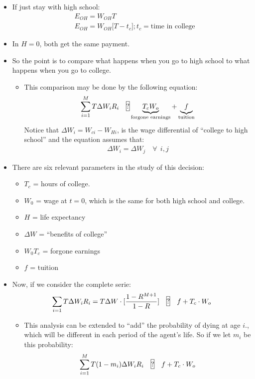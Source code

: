 \documentclass[14pt,notitlepage]{article}
\begin{document}
\begin{itemize}
\item If just stay with high school:
\begin{align*}
&E_{OH} = W_{OH} T \\
&E_{OH} = W_{OH} \big[ T - t_c \big]; t_c = \text{time in college}
\end{align*}
\item In $H=0$, both get the same payment.
\item So the point is to compare what happens when you go to high school to what happens when you go to college. \\
    \begin{itemize}
    \item This comparison may be done by the following equation:
    \begin{align*}
    \sum \limits_{i=1}^{M} T \Delta W_i R_i \quad \framebox[1.1\width]{?} \underbrace{T_c W_o}_{\text{forgone earnings}} + \underbrace{f}_{\text{tuition}}
    \end{align*}
    Notice that $\Delta W_i = W_{ci} - W_{Hi}$, is the wage differential of ``college to high school'' and the equation assumes that:
    \begin{align*}
    \Delta W_i = \Delta W_j \quad \forall\ \ i, j
    \end{align*}
    \end{itemize}
\item There are six relevant parameters in the study of this decision:
    \begin{itemize}
    \item $T_c$ = hours of college.
    \item $W_0$ = wage at $t=0$, which is the same for both high school and college.
    \item $H$ = life expectancy
    \item $\Delta W$ = ``benefits of college''
    \item $W_0 T_c$ = forgone earnings
    \item $f$ = tuition
    \end{itemize}
\item Now, if we consider the complete serie:
\begin{align*}
\sum \limits_{i=1} T \Delta W_i R_i = T \Delta W \cdot [\frac{1 - R^{M+1}}{1 - R}] \quad \framebox[1.1\width]{?} \quad f + T_c \cdot W_o
\end{align*}
    \begin{itemize}
    \item This analysis can be extended to ``add'' the probability of dying at age $i$., which will be different in each period of the agent's life. So if we let $m_i$ be this probability:
    \begin{align*}
    \sum \limits_{i=1}^{M} T (1-m_i) \Delta W_i R_i \quad \framebox[1.1\width]{?} \quad f + T_c \cdot W_o
    \end{align*}


\end{itemize}
\end{itemize}
\end{document}
